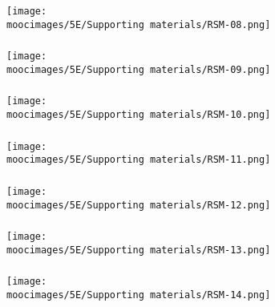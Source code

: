 \documentclass[handout,11pt,aspectratio=169,mathserif]{beamer}
\begin{document}
\begin{frame}\frametitle{}
	\centerline{\texttt{[image: \\moocimages/5E/Supporting materials/RSM-08.png]}}
\end{frame}
\begin{frame}\frametitle{}
	\centerline{\texttt{[image: \\moocimages/5E/Supporting materials/RSM-09.png]}}
\end{frame}
\begin{frame}\frametitle{}
	\centerline{\texttt{[image: \\moocimages/5E/Supporting materials/RSM-10.png]}}
\end{frame}
\begin{frame}\frametitle{}
	\centerline{\texttt{[image: \\moocimages/5E/Supporting materials/RSM-11.png]}}
\end{frame}
\begin{frame}\frametitle{}
	\centerline{\texttt{[image: \\moocimages/5E/Supporting materials/RSM-12.png]}}
\end{frame}
\begin{frame}\frametitle{}
	\centerline{\texttt{[image: \\moocimages/5E/Supporting materials/RSM-13.png]}}
\end{frame}
\begin{frame}\frametitle{}
	\centerline{\texttt{[image: \\moocimages/5E/Supporting materials/RSM-14.png]}}
\end{frame}
\end{document}
